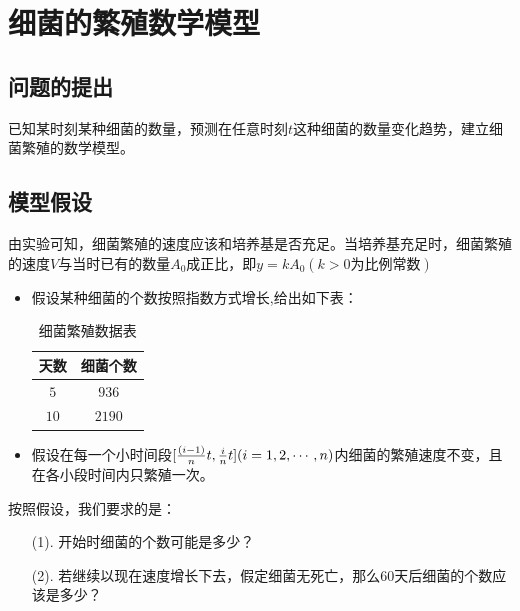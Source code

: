 \documentclass[openany]{progbookcn}
\begin{document}
\section{细菌的繁殖数学模型}
\subsection{问题的提出}
\indent 已知某时刻某种细菌的数量，预测在任意时刻$t$这种细菌的数量变化趋势，建立细菌繁殖的数学模型。
\subsection{模型假设}
\indent 由实验可知，细菌繁殖的速度应该和培养基是否充足。当培养基充足时，细菌繁殖的速度$V$与当时已有的数量$A_0$成正比，即$y=kA_0(k>0\mbox{为比例常数})$
\begin{itemize}
\item 假设某种细菌的个数按照指数方式增长,给出如下表：
\begin{table}[htbp]
\centering
\caption{细菌繁殖数据表}
\begin{tabular}{|c|c|}
\hline
天数 & 细菌个数 \\
\hline
{$5$} & $936$\\
\hline
{$10$} & $2190$\\
\hline 
\end{tabular}
\end{table}
\item 假设在每一个小时间段$[{{(i-1)}\over n}t,{i\over n}t](i=1,2,\cdots,n)$内细菌的繁殖速度不变，且在各小段时间内只繁殖一次。
\end{itemize}
\indent 按照假设，我们要求的是：
\begin{enumerate}[itemindent=2em]
\item [(1).]开始时细菌的个数可能是多少？
\item [(2).]若继续以现在速度增长下去，假定细菌无死亡，那么60天后细菌的个数应该是多少？
\end{enumerate}
\end{document}
